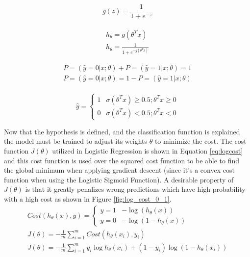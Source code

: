 \begin{multicols}{2}
    \begin{equation} \label{eq:sigmoid}
        g(z) = \frac{1}{1 + e^{-z}}
    \end{equation} 
    \\
    \begin{equation} \label{eq:loghyp}
        \begin{aligned}
            h_\theta = g(\theta^Tx)\\[0.1cm]
            h_\theta = \frac{1}{1 + e^{-g(\theta^Tx)}}
        \end{aligned}
    \end{equation}
\end{multicols}
\begin{multicols}{2}
\begin{equation} \label{eq:logprob}
    \begin{aligned}
        P=(\hat y = 0 | x;\theta) + P=(\hat y = 1 | x;\theta) = 1 \\[0.1cm]
        P=(\hat y = 0 | x;\theta) = 1 - P = (\hat y = 1 | x;\theta)
    \end{aligned}
\end{equation}
\\
\begin{equation} \label{eq:logboundary}
    \hat{y} = \begin{cases} 1 & \sigma(\theta^Tx) \geq 0.5 ; \theta^Tx \geq 0 \\ 0 & \sigma(\theta^Tx) < 0.5 ; \theta^Tx < 0 \end{cases}
\end{equation}
\end{multicols}
\noindent Now that the hypothesis is defined, and the classification function is explained the model must be trained to adjust its weights \(\theta\) to minimize the cost. The cost function \(J(\theta)\) utilized in Logistic Regression is shown in Equation \eqref{eq:logcost} and this cost function is used over the squared cost function to be able to find the global minimum when applying gradient descent (since it’s a convex cost function when using the Logistic Sigmoid Function). A desirable property of \(J(\theta)\) is that it greatly penalizes wrong predictions which have high probability with a high cost as shown in Figure \ref{fig:log_cost_0_1}. 
\begin{equation} \label{eq:logcost}
    \begin{aligned}
        Cost(h_\theta(x), y) = \begin{cases} y = 1 & -\log(h_\theta(x)) \\ y = 0 & -\log(1 - h_\theta(x)) \end{cases}
        \\
        J(\theta) = - \frac{1}{m} \sum\limits_{i=1}^{m} {Cost(h_\theta(x_i), y_i)}
        \\
        {J(\theta)} = - \frac{1}{m} \sum\limits_{i=1}^{m} {y_i \log h_\theta(x_i) + (1 - y_i) \log(1 - h_\theta(x_i))}
    \end{aligned}
\end{equation}
